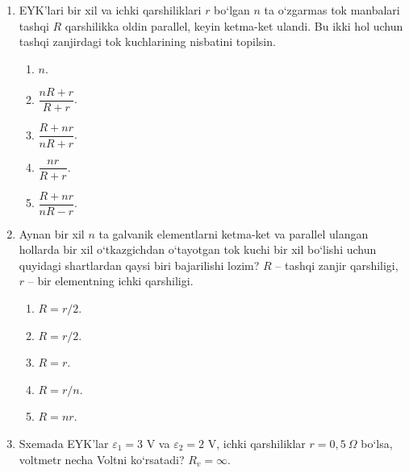 \begin{enumerate}
\item EYK’lari bir xil va ichki qarshiliklari $r$ bo‘lgan $n$ ta o‘zgarmas tok manbalari tashqi $R$ qarshilikka oldin parallel, keyin ketma-ket ulandi. Bu ikki hol uchun tashqi zanjirdagi tok kuchlarining nisbatini topilsin.
\begin{enumerate}[label=\Alph*)]
\item $n$.
\item $\dfrac{nR+r}{R+r}$.
\item $\dfrac{R+nr}{nR+r}$.
\item $\dfrac{nr}{R+r}$.
\item $\dfrac{R+nr}{nR-r}$.
\end{enumerate}

\item Aynan bir xil $n$ ta galvanik elementlarni ketma-ket va parallel ulangan hollarda bir xil o‘tkazgichdan o‘tayotgan tok kuchi bir xil bo‘lishi uchun quyidagi shartlardan qaysi biri bajarilishi lozim? $R$ -- tashqi zanjir qarshiligi, $r$ -- bir elementning ichki qarshiligi.
\begin{enumerate}[label=\Alph*)]
\item $R=r/2$.
\item $R=r/2$.
\item $R=r$.
\item $R=r/n$.
\item $R=nr$.
\end{enumerate}

\item Sxemada EYK’lar $\varepsilon_1=3$ V va $\varepsilon_2=2$ V, ichki qarshiliklar $r=0,5~\Omega$ bo‘lsa, voltmetr necha Voltni ko‘rsatadi? $R_v=\infty$.

\end{enumerate}
